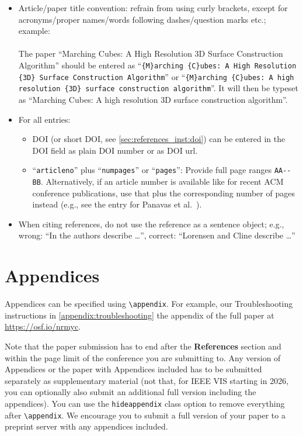 \documentclass[journal]{vgtc}                     %
\begin{document}
\begin{itemize}
  \item Article/paper title convention: refrain from using curly brackets, except for acronyms/proper names/words following dashes/question marks etc.; example:\\\\
        The paper ``Marching Cubes: A High Resolution 3D Surface Construction Algorithm'' should be entered as ``\texttt{\{M\}arching \{C\}ubes: A High Resolution \{3D\} Surface Construction Algorithm}'' or  ``\texttt{\{M\}arching \{C\}ubes: A high resolution \{3D\} surface construction algorithm}''.
        It will then be typeset as ``Marching Cubes: A high resolution 3D surface construction algorithm''.
  \item For all entries:
        \begin{itemize}
  	      \item DOI (or short DOI, see \cref{sec:references_inst:doi}) can be entered in the DOI field as plain DOI number or as DOI url.
  	      \item ``\texttt{articleno}'' plus ``\texttt{numpages}'' or ``\texttt{pages}'': Provide full page ranges \texttt{AA-{}-BB}. Alternatively, if an article number is available like for recent ACM conference publications, use that plus the corresponding number of pages instead (e.g., see the entry for Panavas et al.\ \cite{Panavas2022JuvenileGraphicalPerception}).
        \end{itemize}
  \item When citing references, do not use the reference as a sentence object; e.g., wrong: ``In \cite{Lorensen1987MarchingCubesHigh} the authors describe \dots'', correct: ``Lorensen and Cline \cite{Lorensen1987MarchingCubesHigh} describe \dots''
\end{itemize}

\section{Appendices}
\label{sec:appendices_inst}

Appendices can be specified using \verb|\appendix|.
For example, our Troubleshooting instructions in
  {\cref{appendix:troubleshooting}}
  {the appendix of the full paper at \url{https://osf.io/nrmyc}}.

Note that the paper submission has to end after the \textbf{References} section and within the page limit of the conference you are submitting to.
Any version of Appendices or the paper with Appendices included has to be submitted separately as supplementary material (not that, for IEEE VIS starting in 2026, you can optionally also submit an additional full version including the appendices).
You can use the \verb|hideappendix| class option to remove everything after \verb|\appendix|.
We encourage you to submit a full version of your paper to a preprint server with any appendices included.
\end{document}
